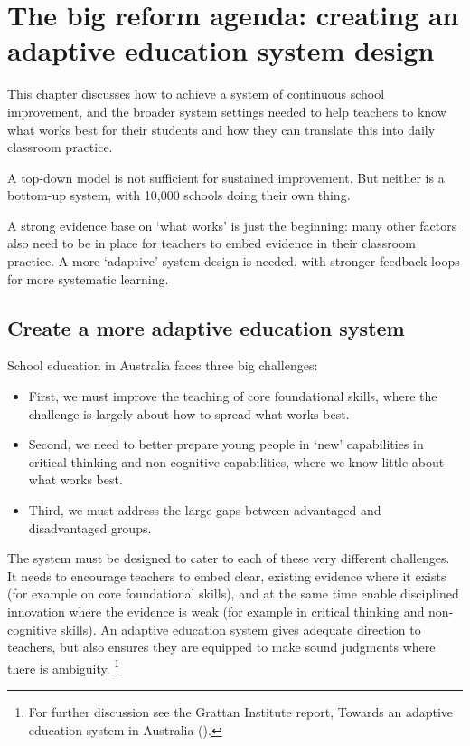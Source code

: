 \chapter{The big reform agenda: creating an adaptive education system design}\label{chap:Design_an_adaptive_system_of_continuous_improvement}

This chapter discusses how to achieve a system of continuous school improvement, and the broader system settings needed to help teachers to know what works best for their students and how they can translate this into daily classroom practice. 

A top-down model is not sufficient for sustained improvement. But neither is a bottom-up system, with 10,000 schools doing their own thing. 

A strong evidence base on `what works' is just the beginning: many other factors also need to be in place for teachers to embed evidence in their classroom practice. A more `adaptive' system design is needed, with stronger feedback loops for more systematic learning.

\section{Create a more adaptive education system}\label{sec:Create-a-more-adaptive-education-system}

School education in Australia faces three big challenges: 

\begin{itemize}
    \item First, we must improve the teaching of core foundational skills, where the challenge is largely about how to spread what works best. 
    \item Second, we need to better prepare young people in `new' capabilities in critical thinking and non-cognitive capabilities, where we know little about what works best.
    \item Third, we must address the large gaps between advantaged and disadvantaged groups.
\end{itemize}

The system must be designed to cater to each of these very different challenges. It needs to encourage teachers to embed clear, existing evidence where it exists (for example on core foundational skills), and at the same time enable disciplined innovation where the evidence is weak (for example in critical thinking and non-cognitive skills). An adaptive education system gives adequate direction to teachers, but also ensures they are equipped to make sound judgments where there is ambiguity.%
\footnote{For further discussion see the Grattan Institute report, Towards an adaptive education system in Australia (\textcite{Goss2017TowardsAnAdaptiveSystem}).}

